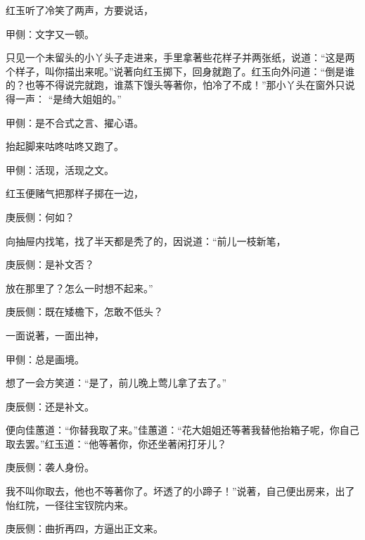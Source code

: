 \begin{parag}
    红玉听了冷笑了两声，方要说话，\begin{note}甲侧：文字又一顿。\end{note}只见一个未留头的小丫头子走进来，手里拿著些花样子并两张纸，说道：“这是两个样子，叫你描出来呢。”说著向红玉掷下，回身就跑了。红玉向外问道：“倒是谁的？也等不得说完就跑，谁蒸下馒头等著你，怕冷了不成！”那小丫头在窗外只说得一声： “是绮大姐姐的。”\begin{note}甲侧：是不合式之言、擢心语。\end{note}抬起脚来咕咚咕咚又跑了。\begin{note}甲侧：活现，活现之文。\end{note}红玉便赌气把那样子掷在一边，\begin{note}庚辰侧：何如？\end{note}向抽屉内找笔，找了半天都是秃了的，因说道：“前儿一枝新笔，\begin{note}庚辰侧：是补文否？\end{note}放在那里了？怎么一时想不起来。”\begin{note}庚辰侧：既在矮檐下，怎敢不低头？\end{note}一面说著，一面出神，\begin{note}甲侧：总是画境。\end{note}想了一会方笑道：“是了，前儿晚上莺儿拿了去了。”\begin{note}庚辰侧：还是补文。\end{note}便向佳蕙道：“你替我取了来。”佳蕙道：“花大姐姐还等著我替他抬箱子呢，你自己取去罢。”红玉道：“他等著你，你还坐著闲打牙儿？\begin{note}庚辰侧：袭人身份。\end{note}我不叫你取去，他也不等著你了。坏透了的小蹄子！”说著，自己便出房来，出了怡红院，一径往宝钗院内来。\begin{note}庚辰侧：曲折再四，方逼出正文来。\end{note}
\end{parag}


